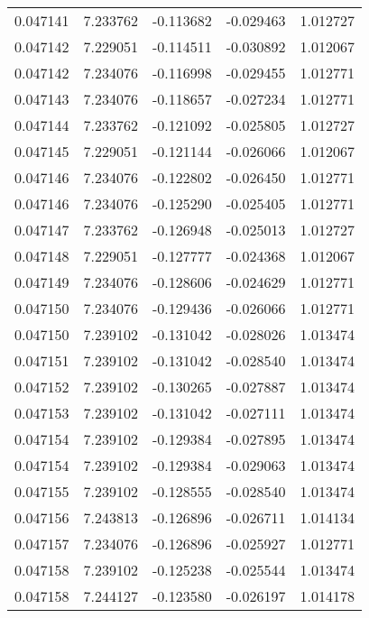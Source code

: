 \begin{tabular}{lrrrr}
0.047141    &  7.233762 & -0.113682 & -0.029463 &             1.012727 \\
0.047142    &  7.229051 & -0.114511 & -0.030892 &             1.012067 \\
0.047142    &  7.234076 & -0.116998 & -0.029455 &             1.012771 \\
0.047143    &  7.234076 & -0.118657 & -0.027234 &             1.012771 \\
0.047144    &  7.233762 & -0.121092 & -0.025805 &             1.012727 \\
0.047145    &  7.229051 & -0.121144 & -0.026066 &             1.012067 \\
0.047146    &  7.234076 & -0.122802 & -0.026450 &             1.012771 \\
0.047146    &  7.234076 & -0.125290 & -0.025405 &             1.012771 \\
0.047147    &  7.233762 & -0.126948 & -0.025013 &             1.012727 \\
0.047148    &  7.229051 & -0.127777 & -0.024368 &             1.012067 \\
0.047149    &  7.234076 & -0.128606 & -0.024629 &             1.012771 \\
0.047150    &  7.234076 & -0.129436 & -0.026066 &             1.012771 \\
0.047150    &  7.239102 & -0.131042 & -0.028026 &             1.013474 \\
0.047151    &  7.239102 & -0.131042 & -0.028540 &             1.013474 \\
0.047152    &  7.239102 & -0.130265 & -0.027887 &             1.013474 \\
0.047153    &  7.239102 & -0.131042 & -0.027111 &             1.013474 \\
0.047154    &  7.239102 & -0.129384 & -0.027895 &             1.013474 \\
0.047154    &  7.239102 & -0.129384 & -0.029063 &             1.013474 \\
0.047155    &  7.239102 & -0.128555 & -0.028540 &             1.013474 \\
0.047156    &  7.243813 & -0.126896 & -0.026711 &             1.014134 \\
0.047157    &  7.234076 & -0.126896 & -0.025927 &             1.012771 \\
0.047158    &  7.239102 & -0.125238 & -0.025544 &             1.013474 \\
0.047158    &  7.244127 & -0.123580 & -0.026197 &             1.014178 \\

\end{tabular}
